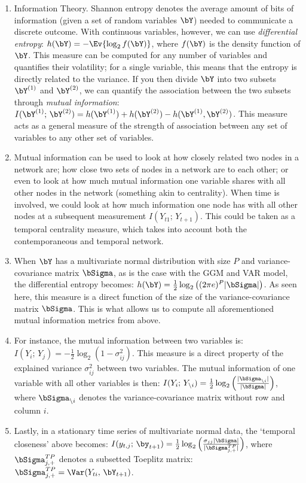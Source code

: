 \begin{enumerate}
\begin{enumerate}
        \item Information Theory. Shannon entropy denotes the average amount of bits of information (given a set of random variables $\bY$) needed to communicate a discrete outcome. With continuous variables, however, we can use \textit{differential entropy}: $h(\bY) = -\Ev{\log_2 f(\bY)}$, where $f(\bY)$ is the density function of $\bY$. This measure can be computed for any number of variables and quantifies their volatility; for a single variable, this means that the entropy is directly related to the variance. If you then divide $\bY$ into two subsets $\bY^{(1)}$ and $\bY^{(2)}$, we can quantify the association between the two subsets through \textit{mutual information}: $I(\bY^{(1)};\,\bY^{(2)}) = h(\bY^{(1)}) + h(\bY^{(2)}) - h(\bY^{(1)},\bY^{(2)})$. This measure acts as a general measure of the strength of association between any set of variables to any other set of variables. 
        \item Mutual information can be used to look at how closely related two nodes in a network are; how close two sets of nodes in a network are to each other; or even to look at how much mutual information one variable shares with all other nodes in the network (something akin to centrality). When time is involved, we could look at how much information one node has with all other nodes at a subsequent measurement $I(Y_{t1};\,Y_{t+1})$. This could be taken as a temporal centrality measure, which takes into account both the contemporaneous and temporal network. 
        \item When $\bY$ has a multivariate normal distribution with size $P$ and variance-covariance matrix $\bSigma$, as is the case with the GGM and VAR model, the differential entropy becomes: $h(\bY) = \frac{1}{2}\log_2 \big((2\pi e)^P |\bSigma|\big)$. As seen here, this measure is a direct function of the size of the variance-covariance matrix $\bSigma$. This is what allows us to compute all aforementioned mutual information metrics from above. 
        \item For instance, the mutual information between two variables is: $I(Y_i;\,Y_j) = -\frac{1}{2}\log_2 (1 - \sigma_{ij}^2)$. This measure is a direct property of the explained variance $\sigma_{ij}^2$ between two variables. The mutual information of one variable with all other variables is then: $I(Y_i;\,Y_{\setminus i}) = \frac{1}{2}\log_2 \Big(\frac{|\bSigma_{\setminus i}|}{|\bSigma|}\Big)$, where $\bSigma_{\setminus i}$ denotes the variance-covariance matrix without row and column $i$. 
        \item Lastly, in a stationary time series of multivariate normal data, the `temporal closeness' above becomes: $I(y_{t,j};\,\by_{t+1}) = \frac{1}{2}\log_2\Big(\frac{\sigma_{jj}|\bSigma|}{|\bSigma_{j,+}^{TP}|}\Big)$, where $\bSigma_{j,+}^{TP}$ denotes a subsetted Toeplitz matrix: $\bSigma_{j,+}^{TP} = \Var(Y_{ti},\,\bY_{t+1})$.

\end{enumerate}
\end{enumerate}
